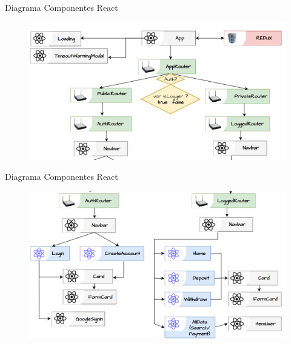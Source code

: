 \documentclass[xcolor=pdftex,dvipsnames,table]{beamer}
\begin{document}
\begin{frame}{Diagrama Componentes React}
        \begin{figure}
            \centering
            \includegraphics[width=1\linewidth]{front/front1.png}
            \label{fig:my_label}
        \end{figure}
\end{frame}
\begin{frame}{Diagrama Componentes React}
        \begin{figure}
            \centering
            \includegraphics[width=1\linewidth]{front/front2.png}
            \label{fig:my_label}
        \end{figure}
\end{frame}
\end{document}
